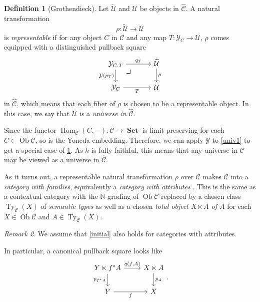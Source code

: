 \documentclass[10pt,letterpaper,cm]{nupset}
\theoremstyle{definition}
\newtheorem{definition}{Definition}[subsection]
\theoremstyle{theorem}
\theoremstyle{remark}
\newtheorem{remark}[definition]{Remark}
\DeclareMathOperator{\ob}{Ob}
\DeclareMathOperator{\Ty}{Ty}
\newcommand{\0}{\mathbf{0}}
\newcommand{\1}{\mathbf{1}}
\newcommand{\2}{\mathbf{2}}
\DeclareMathOperator{\set}{\mathbf{Set}}
\renewcommand{\c}{\mathscr{C}}
\newcommand{\N}{\mathbb N}
\DeclareMathOperator{\Hom}{Hom}
\begin{document}
\begin{definition}[Grothendieck]\label{univ2}
 Let $\widetilde{\mathcal{U}}$ and $\mathcal{U}$  be objects in $\widehat{\c}$. A natural transformation $$\rho: \widetilde{\mathcal{U}} \to \mathcal{U}$$ is \textit{representable} if for any object $C$ in $\c$ and any map $T : \mathcal{Y}_C \to \mathcal{U}$, $\rho$ comes equipped with a distinguished pullback square
\[
\begin{tikzcd}[column sep=large]
\mathcal{Y}_{C\ldotp{T}} \arrow[d, "{\mathcal{Y}(p_T)}"']  \arrow[r, "q_T"] \arrow[dr, phantom, "\scalebox{1.5}{\color{black}$\lrcorner$}" , very near start, color=black] & \widetilde{\mathcal{U}} \arrow[d, "\rho"] \\
\mathcal{Y}_C \arrow[r, "T"']                                      & \mathcal{U}                              
\end{tikzcd}
\] in $\widehat{\c}$, which means that each fiber of $\rho$ is chosen to be a representable object. In this case, we say that $\mathcal{U}$ is a \textit{universe in $\widehat{\c}$}.
\end{definition}

Since the functor $\Hom_{\c}(C, {-}): \c \to \set$ is limit preserving for each $C\in \ob{\c}$, so is the Yoneda embedding. Therefore, we can apply $\mathcal{Y}$ to \cref{univ1} to get a special case of \cref{univ2}. As $h$  is fully faithful, this means that any universe in $\c$ may be viewed as a universe in $\widehat{\c}$.

\medskip

As it turns out, a representable natural transformation $\rho$ over $\c$ makes $\c$ into a \textit{category with families}, equivalently a \textit{category with attributes} \cite[Definition 6.3.3]{Pitts}. This is the same as a contextual category with the $\N$-grading of $\ob{\c}$ replaced by a chosen class $\Ty_{\c}(X)$ of \textit{semantic types} as well as a chosen \textit{total object $X\ltimes A$ of $A$} for each $X\in \ob{\c}$ and $A\in \Ty_{\c}(X)$. 

\begin{remark}
 We assume that \cref{initial} also holds for categories with attributes.
\end{remark}

In particular, a canonical pullback square looks like
\[
\begin{tikzcd}
Y \ltimes f^{\ast}{A} \arrow[d, "p_{f^{\ast}{A}}"'] \arrow[r, "{q(f, A)}"] & X\ltimes A \arrow[d, "p_A"] \\
Y \arrow[r, "f"']                                                          & X                          
\end{tikzcd}.
\]
\end{document}

